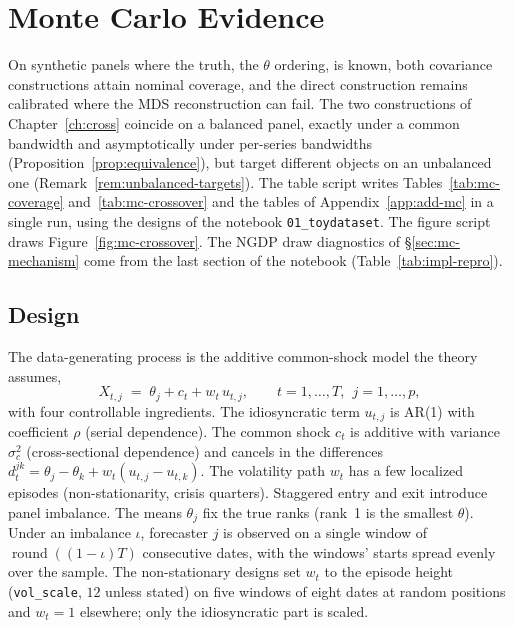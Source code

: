 \chapter{Monte Carlo Evidence}
\label{ch:mc}

On synthetic panels where the truth, the $\theta$ ordering, is known, both covariance
constructions attain nominal coverage, and the direct construction remains calibrated
where the MDS reconstruction can fail. The two constructions of Chapter~\ref{ch:cross}
coincide on a balanced panel, exactly under a common bandwidth and asymptotically under
per-series bandwidths (Proposition~\ref{prop:equivalence}), but target different objects
on an unbalanced one (Remark~\ref{rem:unbalanced-targets}). The table script writes
Tables~\ref{tab:mc-coverage} and~\ref{tab:mc-crossover} and the tables of
Appendix~\ref{app:add-mc} in a single run, using the designs of the notebook
\texttt{01\_toydataset}. The figure script draws Figure~\ref{fig:mc-crossover}. The NGDP
draw diagnostics of \S\ref{sec:mc-mechanism} come from the last section of the notebook
(Table~\ref{tab:impl-repro}).

\section{Design}
\label{sec:mc-design}

The data-generating process is the additive common-shock model the theory assumes,
\begin{equation}
  X_{t,j} \;=\; \theta_j + c_t + w_t\,u_{t,j},
  \qquad t=1,\dots,T,\ \ j=1,\dots,p,
  \label{eq:dgp}
\end{equation}
with four controllable ingredients. The idiosyncratic term $u_{t,j}$ is AR(1) with
coefficient $\rho$ (serial dependence). The common shock $c_t$ is additive with variance
$\sigma_c^2$ (cross-sectional dependence) and cancels in the differences
$d^{jk}_t = \theta_j-\theta_k + w_t(u_{t,j}-u_{t,k})$. The volatility path $w_t$ has a
few localized episodes (non-stationarity, crisis quarters). Staggered entry and exit
introduce panel imbalance. The means $\theta_j$ fix the true ranks (rank~1 is the
smallest $\theta$). Under an imbalance $\iota$, forecaster $j$ is observed on a single
window of $\operatorname{round}((1-\iota)T)$ consecutive dates, with the windows' starts
spread evenly over the sample. The non-stationary designs set $w_t$ to the episode height
(\texttt{vol\_scale}, $12$ unless stated) on five windows of eight dates at random
positions and $w_t=1$ elsewhere; only the idiosyncratic part is scaled.

